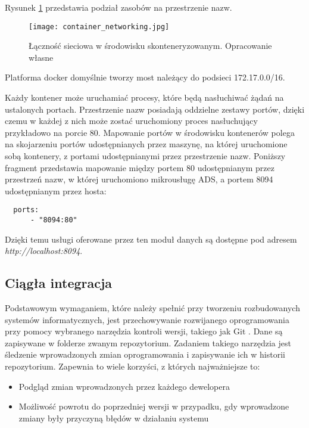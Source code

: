 Rysunek \ref{fig:container-networking} przedstawia podział zasobów na przestrzenie nazw.

\begin{figure}[h]
  \centering
  \texttt{[image: container\_networking.jpg]}
  \caption{Łączność sieciowa w środowisku skonteneryzowanym. Opracowanie własne}
  \label{fig:container-networking}
\end{figure}

Platforma docker domyślnie tworzy most należący do podsieci 172.17.0.0/16.

Każdy kontener może uruchamiać procesy, które będą nasłuchiwać żądań na ustalonych portach.
Przestrzenie nazw posiadają oddzielne zestawy portów, dzięki czemu w każdej z nich może
zostać uruchomiony proces nasłuchujący przykładowo na porcie 80. Mapowanie portów w środowisku
kontenerów polega na skojarzeniu portów udostępnianych przez maszynę, na której uruchomione sobą
kontenery, z portami udostępnianymi przez przestrzenie nazw. Poniższy fragment przedstawia 
mapowanie między portem 80 udostępnianym przez przestrzeń nazw, w której uruchomiono mikrousługę ADS, 
a portem 8094 udostępnianym przez hosta:

\begin{lstlisting}
  ports:
      - "8094:80"
\end{lstlisting}

Dzięki temu usługi oferowane przez ten moduł danych są dostępne
pod adresem \textit{http://localhost:8094}.

\subsection{Ciągła integracja}

Podstawowym wymaganiem, które należy spełnić przy tworzeniu rozbudowanych systemów 
informatycznych, jest przechowywanie rozwijanego oprogramowania przy pomocy wybranego 
narzędzia kontroli wersji, takiego jak Git \cite{git2022}. Dane są zapisywane w folderze zwanym 
repozytorium. Zadaniem takiego narzędzia jest śledzenie wprowadzonych zmian 
oprogramowania i zapisywanie ich w historii repozytorium. Zapewnia to wiele 
korzyści, z których najważniejsze to:

\begin{itemize} %
    \item Podgląd zmian wprowadzonych przez każdego dewelopera
    \item Możliwość powrotu do poprzedniej wersji w przypadku, gdy wprowadzone zmiany 
    były przyczyną błędów w działaniu systemu
\end{itemize}

